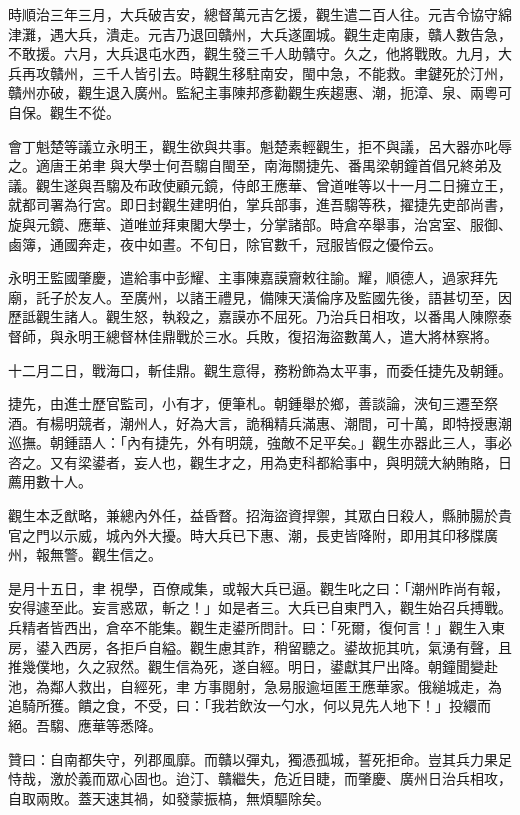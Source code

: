 \begin{pinyinscope}
時順治三年三月，大兵破吉安，總督萬元吉乞援，觀生遣二百人往。元吉令協守綿津灘，遇大兵，潰走。元吉乃退回贛州，大兵遂圍城。觀生走南康，贛人數告急，不敢援。六月，大兵退屯水西，觀生發三千人助贛守。久之，他將戰敗。九月，大兵再攻贛州，三千人皆引去。時觀生移駐南安，閩中急，不能救。聿鍵死於汀州，贛州亦破，觀生退入廣州。監紀主事陳邦彥勸觀生疾趨惠、潮，扼漳、泉、兩粵可自保。觀生不從。

會丁魁楚等議立永明王，觀生欲與共事。魁楚素輕觀生，拒不與議，呂大器亦叱辱之。適唐王弟聿與大學士何吾騶自閩至，南海關捷先、番禺梁朝鐘首倡兄終弟及議。觀生遂與吾騶及布政使顧元鏡，侍郎王應華、曾道唯等以十一月二日擁立王，就都司署為行宮。即日封觀生建明伯，掌兵部事，進吾騶等秩，擢捷先吏部尚書，旋與元鏡、應華、道唯並拜東閣大學士，分掌諸部。時倉卒舉事，治宮室、服御、鹵簿，通國奔走，夜中如晝。不旬日，除官數千，冠服皆假之優伶云。

永明王監國肇慶，遣給事中彭耀、主事陳嘉謨齎敕往諭。耀，順德人，過家拜先廟，託子於友人。至廣州，以諸王禮見，備陳天潢倫序及監國先後，語甚切至，因歷詆觀生諸人。觀生怒，執殺之，嘉謨亦不屈死。乃治兵日相攻，以番禺人陳際泰督師，與永明王總督林佳鼎戰於三水。兵敗，復招海盜數萬人，遣大將林察將。

十二月二日，戰海口，斬佳鼎。觀生意得，務粉飾為太平事，而委任捷先及朝鍾。

捷先，由進士歷官監司，小有才，便筆札。朝鍾舉於鄉，善談論，浹旬三遷至祭酒。有楊明競者，潮州人，好為大言，詭稱精兵滿惠、潮間，可十萬，即特授惠潮巡撫。朝鍾語人：「內有捷先，外有明競，強敵不足平矣。」觀生亦器此三人，事必咨之。又有梁鍙者，妄人也，觀生才之，用為吏科都給事中，與明競大納賄賂，日薦用數十人。

觀生本乏猷略，兼總內外任，益昏瞀。招海盜資捍禦，其眾白日殺人，縣肺腸於貴官之門以示威，城內外大擾。時大兵已下惠、潮，長吏皆降附，即用其印移牒廣州，報無警。觀生信之。

是月十五日，聿視學，百僚咸集，或報大兵已逼。觀生叱之曰：「潮州昨尚有報，安得遽至此。妄言惑眾，斬之！」如是者三。大兵已自東門入，觀生始召兵搏戰。兵精者皆西出，倉卒不能集。觀生走鍙所問計。曰：「死爾，復何言！」觀生入東房，鍙入西房，各拒戶自縊。觀生慮其詐，稍留聽之。鍙故扼其吭，氣湧有聲，且推幾僕地，久之寂然。觀生信為死，遂自經。明日，鍙獻其尸出降。朝鐘聞變赴池，為鄰人救出，自經死，聿方事閱射，急易服逾垣匿王應華家。俄縋城走，為追騎所獲。饋之食，不受，曰：「我若飲汝一勺水，何以見先人地下！」投繯而絕。吾騶、應華等悉降。

贊曰：自南都失守，列郡風靡。而贛以彈丸，獨憑孤城，誓死拒命。豈其兵力果足恃哉，激於義而眾心固也。迨汀、贛繼失，危近目睫，而肇慶、廣州日治兵相攻，自取兩敗。蓋天速其禍，如發蒙振槁，無煩驅除矣。


\end{pinyinscope}